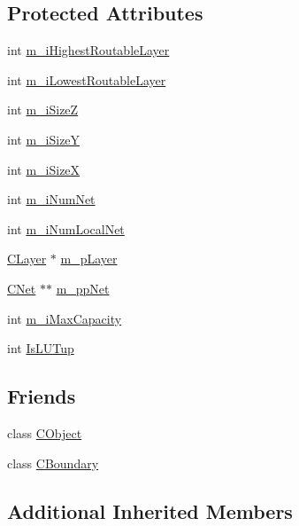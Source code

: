 \subsection*{Protected Attributes}
\begin{DoxyCompactItemize}
\item 
int \mbox{\hyperlink{classCDesign_a73e93c380828f4f6da2a7b4ce0556db2}{m\+\_\+i\+Highest\+Routable\+Layer}}
\item 
int \mbox{\hyperlink{classCDesign_a31a49f09c0e01c596c67d5393eda9b8d}{m\+\_\+i\+Lowest\+Routable\+Layer}}
\item 
int \mbox{\hyperlink{classCDesign_a7e534936981b8b2b175c7ec6b3ccbb73}{m\+\_\+i\+SizeZ}}
\item 
int \mbox{\hyperlink{classCDesign_a8bf3b27f86d457baf3745d9e48428622}{m\+\_\+i\+SizeY}}
\item 
int \mbox{\hyperlink{classCDesign_aad52df0bb26b096ff636b6d07b0ac46b}{m\+\_\+i\+SizeX}}
\item 
int \mbox{\hyperlink{classCDesign_a8fb5c76e3b7a96e341bbab3083839fed}{m\+\_\+i\+Num\+Net}}
\item 
int \mbox{\hyperlink{classCDesign_a058616ab0dcd0cacdd7803c4e8d0e093}{m\+\_\+i\+Num\+Local\+Net}}
\item 
\mbox{\hyperlink{classCLayer}{C\+Layer}} $\ast$ \mbox{\hyperlink{classCDesign_a6fe2e83d890daebc1c45959177e54fc4}{m\+\_\+p\+Layer}}
\item 
\mbox{\hyperlink{classCNet}{C\+Net}} $\ast$$\ast$ \mbox{\hyperlink{classCDesign_a444cb73bf4b13f1d192c45a3d264d968}{m\+\_\+pp\+Net}}
\item 
int \mbox{\hyperlink{classCDesign_a55bb2e21b5829d2bff1a5f9d8bdd07aa}{m\+\_\+i\+Max\+Capacity}}
\item 
int \mbox{\hyperlink{classCDesign_a48f399e2191567a3f33d09181c879051}{Is\+L\+U\+Tup}}
\end{DoxyCompactItemize}
\subsection*{Friends}
\begin{DoxyCompactItemize}
\item 
class \mbox{\hyperlink{classCDesign_ae1cd88973d218281880da5599c37d866}{C\+Object}}
\item 
class \mbox{\hyperlink{classCDesign_aab1ae13155639bc23234a972a3296244}{C\+Boundary}}
\end{DoxyCompactItemize}
\subsection*{Additional Inherited Members}


